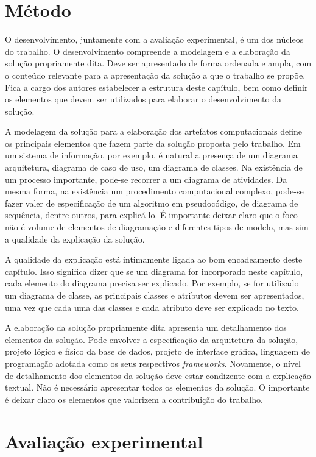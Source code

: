 \documentclass[12pt]{article}
\begin{document}
	\section{Método}
	\label{sec_metodo}
	
	O desenvolvimento, juntamente com a avaliação experimental, é um dos núcleos do trabalho. O desenvolvimento compreende a modelagem e a elaboração da solução propriamente dita. Deve ser apresentado de forma ordenada e ampla, com o conteúdo relevante para a apresentação da solução a que o trabalho se propõe. Fica a cargo dos autores estabelecer a estrutura deste capítulo, bem como definir os elementos que devem ser utilizados para elaborar o desenvolvimento da solução. 
	
	A modelagem da solução para a elaboração dos artefatos computacionais define os principais elementos que fazem parte da solução proposta pelo trabalho. Em um sistema de informação, por exemplo, é natural a presença de um diagrama arquitetura, diagrama de caso de uso, um diagrama de classes. Na existência de um processo importante, pode-se recorrer a um diagrama de atividades. Da mesma forma, na existência um procedimento computacional complexo, pode-se fazer valer de especificação de um algoritmo em pseudocódigo, de diagrama de sequência, dentre outros, para explicá-lo. É importante deixar claro que o foco não é volume de elementos de diagramação e diferentes tipos de modelo, mas sim a qualidade da explicação da solução.
	
	A qualidade da explicação está intimamente ligada ao bom encadeamento deste capítulo. Isso significa dizer que se um diagrama for incorporado neste capítulo, cada elemento do diagrama precisa ser explicado. Por exemplo, se for utilizado um diagrama de classe, as principais classes e atributos devem ser apresentados, uma vez que cada uma das classes e cada atributo deve ser explicado no texto.
	
	A elaboração da solução propriamente dita apresenta um detalhamento dos elementos da solução. Pode envolver a especificação da arquitetura da solução, projeto lógico e físico da base de dados, projeto de interface gráfica, linguagem de programação adotada como os seus respectivos \emph{frameworks}. Novamente, o nível de detalhamento dos elementos da solução deve estar condizente com a explicação textual. Não é necessário apresentar todos os elementos da solução. O importante é deixar claro os elementos que valorizem a contribuição do trabalho.
	
	\section{Avaliação experimental}
	\label{sec_aval_exp}
	
\end{document}

